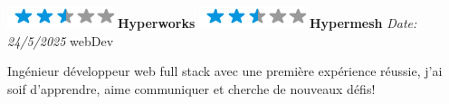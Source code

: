 \documentclass[]{friggeri-cv}
\begin{document}
\begin{aside}
\includegraphics[scale=0.40]{res/img/2-5stars.png}\hspace{1.5mm}\textbf{Hyperworks}
\includegraphics[scale=0.40]{res/img/2-5stars.png}\hspace{1.5mm}\textbf{Hypermesh}
\vspace{2.5mm}%
	\emph{Date: 24/5/2025} \hspace*{8mm}
    {\tiny webDev} %
\end{aside}

\vspace*{-2.0mm}
\noindent\parbox{\linewidth}{
  \centering
  Ingénieur développeur web full stack avec une première expérience réussie, j'ai soif d’apprendre, aime communiquer et cherche de nouveaux défis! 
}
\vspace*{0.8mm}
\end{document}
